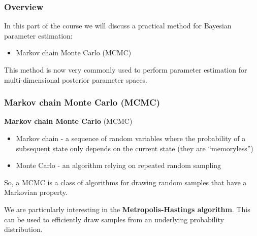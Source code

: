 
\def\mytitle{Part 4: Practical Bayesian methods}
\def\mydate{25 March 2015}
\def\myauthor{Matthew Pitkin}
\def\affiliation{University of Glasgow}
\def\latexxslt{beamer}
\def\latexmode{beamer}
\def\theme{m}
\def\event{GraWIToN School}



%


\begin{frame}

\frametitle{Overview}
\label{overview}

In this part of the course we will discuss a practical method for Bayesian parameter estimation:

\begin{itemize}
\item Markov chain Monte Carlo (MCMC)

\end{itemize}

This method is now very commonly used to perform parameter estimation for multi-dimensional
posterior parameter spaces.

\end{frame}

\begin{frame}

\frametitle{Markov chain Monte Carlo (MCMC)}
\label{markovchainmontecarlomcmc}

\textbf{Markov chain Monte Carlo} (MCMC)

\begin{itemize}
\item Markov chain - a sequence of random variables where the probability of a subsequent state only depends
on the current state (they are ``memoryless'')

\item Monte Carlo - an algorithm relying on repeated random sampling

\end{itemize}

So, a MCMC is a class of algorithms for drawing random samples that have a Markovian property.

We are particularly interesting in the \textbf{Metropolis-Hastings algorithm}. This can be used to efficiently
draw samples from an underlying probability distribution.

\end{frame}

